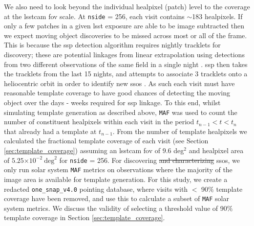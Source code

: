 \documentclass[preprintm,linenumbers]{aastex631}
\newcommand{\baseline}{\texttt{one\_snap\_v4.0}\xspace}
\newcommand{\maf}{\texttt{MAF}\xspace}
\providecommand{\e}[1]{\ensuremath{\times 10^{#1}}}
\begin{document}
		
		We also need to look beyond the individual healpixel (patch) level to the coverage at the \gls*{lsstcam} \gls*{fov} scale. 
  At \texttt{nside} = 256, each visit contains $\sim$183 healpixels.
  If only a few patches in a given \gls*{lsst} exposure are able to be image subtracted then we expect moving object discoveries to be missed across most or all of the frame. 
  This is because the \gls*{ssp} detection algorithm requires nightly tracklets for  discovery; these are potential linkages from linear extrapolation using detections from two different observations of the same field in a single night \citep{lsstMOPS,lsstSSP}.  
  \gls*{ssp} then takes the tracklets from the last 15 nights, and attempts to associate 3 tracklets onto a heliocentric orbit in order to identify new \glspl*{sso} \citep{kubica2007,lsstMOPS,lsstSSP}. 
  As such each visit must have reasonable template coverage to have good chances of detecting the moving object over the days - weeks required for \gls*{ssp} linkage.
  To this end, whilst simulating template generation as described above, \maf was used to count the number of constituent healpixels within each visit in the period $t_{n-1} < t < t_n$ that already had a template at $t_{n-1}$.
  From the number of template healpixels we calculated the fractional template coverage of each visit (see Section \ref{sec:template_coverage}) assuming an \gls*{lsstcam} \gls*{fov} of 9.6 deg$^2$ and healpixel area of $5.25\e{-2}\ \mathrm{deg}^2$ for \texttt{nside} = 256.
  For discovering \sout{and characterizing} \glspl*{sso}, we only run solar system \maf metrics on observations where the majority of the image area is available for template generation. For this study, we create a redacted  \baseline pointing database, where visits with $<$ 90$\%$ template coverage have been removed, and use this to calculate a subset of \maf solar system metrics.  We discuss the validity of selecting a threshold value of 90$\%$  template coverage in Section \ref{sec:template_coverage}.
  
\end{document}

